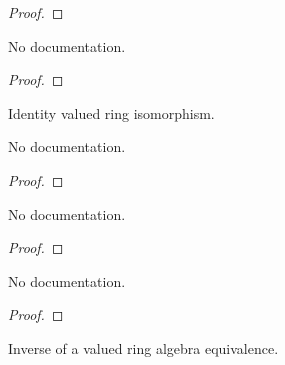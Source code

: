 \begin{definition}
\begin{proof}
    \leanok
\end{proof}

\begin{theorem}\label{ValAlgHom.comp_id}
        \leanok
                No documentation.
    \end{theorem}

\begin{proof}
    \leanok
\end{proof}

\begin{definition}\label{ValAlgEquiv.refl}
        \leanok
                Identity valued ring isomorphism.
    \end{definition}

\begin{theorem}\label{ValAlgEquiv.coe_refl}
        \leanok
                No documentation.
    \end{theorem}

\begin{proof}
    \leanok
\end{proof}

\begin{theorem}\label{ValRingEquiv.refl_apply}
        \leanok
                No documentation.
    \end{theorem}

\begin{proof}
    \leanok
\end{proof}

\begin{theorem}\label{ValRingEquiv.refl_toEquiv}
        \leanok
                No documentation.
    \end{theorem}

\begin{proof}
    \leanok
\end{proof}

\begin{definition}\label{ValAlgEquiv.symm}
        \leanok
                Inverse of a valued ring algebra equivalence.
    \end{definition}


\end{definition}
